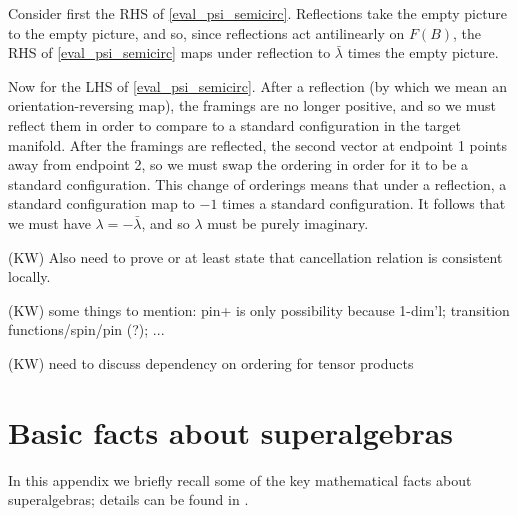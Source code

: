\documentclass[12pt,a4paper]{article}
\newcommand{\kw}[1]{{\color{kwcolor}\footnotesize{(KW) #1}}}
\newcommand{\PsiEnd}{\mathord{\vcenter{\hbox{\texttt{[image: PsiEnd.pdf]}}}}}
\newcommand{\PsiEndExchange}{\mathord{\vcenter{\hbox{\texttt{[image: PsiEndExchange.pdf]}}}}}
\begin{document}
Consider first the RHS of \eqref{eval_psi_semicirc}. 
Reflections take the empty picture to the empty picture, and so, since reflections act antilinearly on $F(B)$,
the RHS of \eqref{eval_psi_semicirc} maps under reflection to $\bar\lambda$ times the empty picture.

Now for the LHS of \eqref{eval_psi_semicirc}.
After a reflection (by which we mean an orientation-reversing map), 
the framings are no longer positive, and so we must reflect them in order to compare to a standard configuration
in the target manifold.
After the framings are reflected, the second vector at endpoint 1 points away from endpoint 2,
so we must swap the ordering in order for it to be a standard configuration.
This change of orderings means that under a reflection, a standard configuration map to $-1$ times a standard
configuration.
It follows that we must have $\lambda = -\bar\lambda$, and so $\lambda$ must be purely imaginary.

\medskip


\kw{Also need to prove or at least state that cancellation relation is consistent locally.}

\kw{some things to mention: pin+ is only possibility because 1-dim'l; transition functions/spin/pin (?); ...}

\kw{need to discuss dependency on ordering for tensor products}















\section{Basic facts about superalgebras} \label{superstuff}

In this appendix we briefly recall some of the key mathematical facts about superalgebras; details can be found in \cite{jozefiak1988}.
\end{document}
